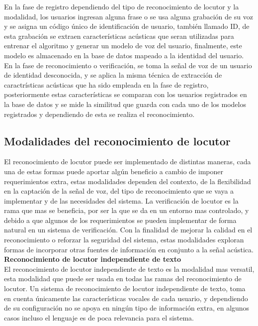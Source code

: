 En la fase de registro dependiendo del tipo de reconocimiento de locutor y la modalidad, los usuarios ingresan alguna frase o se usa alguna grabaci\'on de su voz y se asigna un c\'odigo \'unico de identificaci\'on de usuario, tambi\'en llamado ID, de esta grabaci\'on se extraen caracter\'isticas ac\'usticas que seran utilizadas para entrenar el algoritmo y generar un modelo de voz del usuario, finalmente, este modelo es almacenado en la base de datos mapeado a la identidad del usuario.\\

En la fase de reconocimiento o verificaci\'on, se toma la señal de voz de un usuario de identidad desconocida, y se aplica la misma t\'ecnica de extracci\'on de caractr\'isticas ac\'usticas que ha sido empleada en la fase de registro, posteriormente estas caracter\'isticas se comparan con los usuarios registrados en la base de datos y se mide la similitud que guarda con cada uno de los modelos registrados y dependiendo de esta se realiza el reconocimiento.\\
 
\subsection{Modalidades del reconocimiento de locutor}
El reconocimiento de locutor puede ser implementado de distintas maneras, cada una de estas formas puede aportar alg\'un beneficio a cambio de imponer requerimientos extra, estas modalidades dependen del contexto, de la flexibilidad en la captaci\'on de la señal de voz, del tipo de reconocimiento que se vaya a implementar y de las necesidades del sistema. La verificaci\'on de locutor es la rama que mas se beneficia, por ser la que se da en un entorno mas controlado, y debido a que algunos de los requerimientos se pueden implementar de forma natural en un sistema de verificaci\'on. Con la finalidad de mejorar la calidad en el reconocimiento o reforzar la seguridad del sistema, estas modalidades exploran formas de incorporar otras fuentes de informaci\'on en conjunto a la señal ac\'ustica.\\ 

\textbf{\large Reconocimiento de locutor independiente de texto}\\

El reconocimiento de locutor independiente de texto es la modalidad mas versatil, esta modalidad que puede ser usada en todas las ramas del reconocimiento de locutor. Un sistema de reconocimiento de locutor independiente de texto, toma en cuenta \'unicamente las caracter\'isticas vocales de cada usuario, y dependiendo de su configuraci\'on no se apoya en ning\'un tipo de informaci\'on extra, en algunos casos incluso el lenguaje es de poca relevancia para el sistema.\\ 

